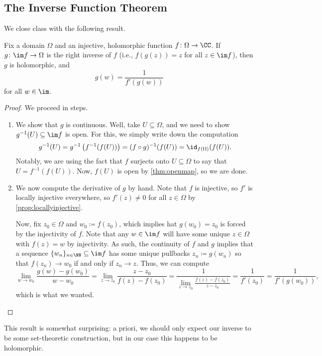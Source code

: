 \subsection{The Inverse Function Theorem}
We close class with the following result.
\begin{theorem} \label{thm:inv}
	Fix a domain $\Omega$ and an injective, holomorphic function $f\colon \Omega\to\CC$. If $g\colon \im f\to\Omega$ is the right inverse of $f$ (i.e., $f(g(z))=z$ for all $z\in\im f$), then $g$ is holomorphic, and
	\[g(w)=\frac1{f'(g(w))}\]
	for all $w\in\im $.
\end{theorem}
\begin{proof}
	We proceed in steps.
	\begin{enumerate}
		\item We show that $g$ is continuous. Well, take $U\subseteq\Omega$, and we need to show $g^{-1}(U)\subseteq\im f$ is open. For this, we simply write down the computation
		\[g^{-1}(U)=g^{-1}\left(f^{-1}(f(U))\right)=(f\circ g)^{-1}(f(U))=\id_{f(\Omega)}(f(U)).\]
		Notably, we are using the fact that $f$ surjects onto $U\subseteq\Omega$ to say that $U=f^{-1}(f(U))$. Now, $f(U)$ is open by \autoref{thm:openmap}, so we are done.
		\item We now compute the derivative of $g$ by hand. Note that $f$ is injective, so $f'$ is locally injective everywhere, so $f'(z)\ne0$ for all $z\in\Omega$ by \autoref{prop:locallyinjective}.
		
		Now, fix $z_0\in\Omega$ and $w_0\coloneqq f(z_0)$, which implies hat $g(w_0)=z_0$ is forced by the injectivity of $f$. Note that any $w\in\im f$ will have some unique $z\in\Omega$ with $f(z)=w$ by injectivity. As such, the continuity of $f$ and $g$ implies that a sequence $\{w_n\}_{n\in\NN}\subseteq\im f$ has some unique pullbacks $z_n\coloneqq g(w_n)$ so that $f(z_n)\to w_0$ if and only if $z_n\to z$. Thus, we can compute
		\[\lim_{w\to w_0}\frac{g(w)-g(w_0)}{w-w_0}=\lim_{z\to z_0}\frac{z-z_0}{f(z)-f(z_0)}=\frac1{\lim_{z\to z_0}\frac{f(z)-f(z_0)}{z-z_0}}=\frac1{f'(z_0)}=\frac1{f'(g(w_0))},\]
		which is what we wanted.
		\qedhere
	\end{enumerate}
\end{proof}
\begin{remark}
	This result is somewhat surprising: a priori, we should only expect our inverse to be some set-theoretic construction, but in our case this happens to be holomorphic.
\end{remark}